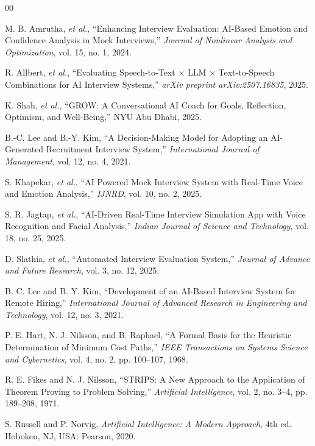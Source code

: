 \documentclass[conference]{IEEEtran}
\begin{document}
\balance
\begin{thebibliography}{00}

 M. B. Amrutha, \textit{et al.}, ``Enhancing Interview Evaluation: AI-Based Emotion and Confidence Analysis in Mock Interviews,'' \textit{Journal of Nonlinear Analysis and Optimization}, vol. 15, no. 1, 2024.

 R. Allbert, \textit{et al.}, ``Evaluating Speech-to-Text $\times$ LLM $\times$ Text-to-Speech Combinations for AI Interview Systems,'' \textit{arXiv preprint arXiv:2507.16835}, 2025.

 K. Shah, \textit{et al.}, ``GROW: A Conversational AI Coach for Goals, Reflection, Optimism, and Well-Being,'' NYU Abu Dhabi, 2025.

 B.-C. Lee and B.-Y. Kim, ``A Decision-Making Model for Adopting an AI-Generated Recruitment Interview System,'' \textit{International Journal of Management}, vol. 12, no. 4, 2021.

 S. Khapekar, \textit{et al.}, ``AI Powered Mock Interview System with Real-Time Voice and Emotion Analysis,'' \textit{IJNRD}, vol. 10, no. 2, 2025.

 S. R. Jagtap, \textit{et al.}, ``AI-Driven Real-Time Interview Simulation App with Voice Recognition and Facial Analysis,'' \textit{Indian Journal of Science and Technology}, vol. 18, no. 25, 2025.

 D. Slathia, \textit{et al.}, ``Automated Interview Evaluation System,'' \textit{Journal of Advance and Future Research}, vol. 3, no. 12, 2025.

 B. C. Lee and B. Y. Kim, ``Development of an AI-Based Interview System for Remote Hiring,'' \textit{International Journal of Advanced Research in Engineering and Technology}, vol. 12, no. 3, 2021.

 P. E. Hart, N. J. Nilsson, and B. Raphael, ``A Formal Basis for the Heuristic Determination of Minimum Cost Paths,'' \textit{IEEE Transactions on Systems Science and Cybernetics}, vol. 4, no. 2, pp. 100--107, 1968.

 R. E. Fikes and N. J. Nilsson, ``STRIPS: A New Approach to the Application of Theorem Proving to Problem Solving,'' \textit{Artificial Intelligence}, vol. 2, no. 3--4, pp. 189--208, 1971.

 S. Russell and P. Norvig, \textit{Artificial Intelligence: A Modern Approach}, 4th ed. Hoboken, NJ, USA: Pearson, 2020.

\end{thebibliography}
\end{document}
